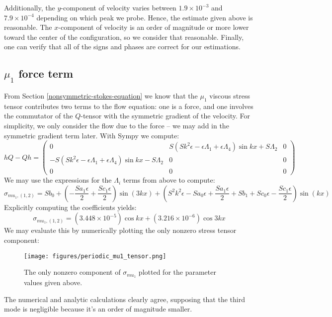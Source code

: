 \documentclass[reqno]{article}
\begin{document}
Additionally, the $y$-component of velocity varies between $1.9 \times 10^{-3}$
and $7.9 \times 10^{-4}$ depending on which peak we probe.
Hence, the estimate given above is reasonable.
The $x$-component of velocity is an order of magnitude or more lower toward the center
of the configuration, so we consider that reasonable.
Finally, one can verify that all of the signs and phases are correct for our
estimations.

\subsection{$\mu_1$ force term}
From Section \ref{nonsymmetric-stokes-equation} we know that the $\mu_1$ viscous
stress tensor contributes two terms to the flow equation: one is a force, and
one involves the commutator of the $Q$-tensor with the symmetric gradient of the
velocity.
For simplicity, we only consider the flow due to the force -- we may add in the
symmetric gradient term later.
With Sympy we compute:
\begin{equation}
  hQ - Qh
  =
  \begin{pmatrix}
    0 & S \left( S k^2 \epsilon - \epsilon \Lambda_1 + \epsilon \Lambda_4 \right) \sin kx + S \Lambda_2 & 0 \\
    -S \left( S k^2 \epsilon - \epsilon \Lambda_1 + \epsilon \Lambda_4 \right) \sin kx - S \Lambda_2 & 0 & 0 \\
    0 & 0 & 0
  \end{pmatrix}
\end{equation}
We may use the expressions for the $\Lambda_i$ terms from above to compute:
\begin{equation}
  \sigma_{mu_1, (1, 2)}
  =
  S b_{0}
  + \left(- \frac{S a_{1} \epsilon}{2}
    + \frac{S c_{1} \epsilon}{2}\right) \sin{\left(3 k x \right)}
  + \left(S^{2} k^{2} \epsilon
    - S a_{0} \epsilon
    + \frac{S a_{1} \epsilon}{2}
    + S b_{1}
    + S c_{0} \epsilon
    - \frac{S c_{1} \epsilon}{2}\right) \sin{\left(k x \right)}
\end{equation}
Explicitly computing the coefficients yields:
\begin{equation}
  \sigma_{mu_1, (1, 2)}
  =
  \left(3.448 \times 10^{-5}\right) \cos kx
  + \left( 3.216 \times 10^{-6} \right) \cos 3kx
\end{equation}
We may evaluate this by numerically plotting the only nonzero stress tensor
component:
\begin{figure}[H]
  \centering
  \texttt{[image: figures/periodic\_mu1\_tensor.png]}
  \caption{The only nonzero component of $\sigma_{mu_1}$ plotted for the
    parameter values given above.}
\end{figure}
The numerical and analytic calculations clearly agree, supposing that the third
mode is negligible because it's an order of magnitude smaller.
\end{document}
